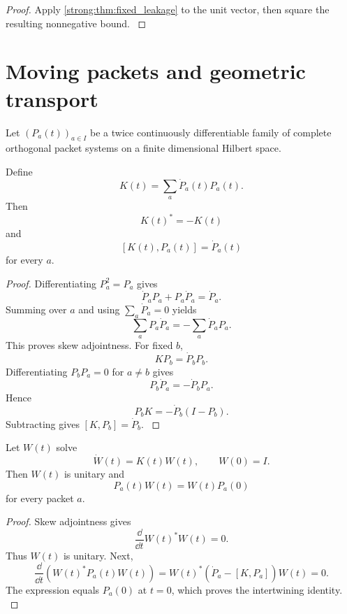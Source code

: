 \begin{proof}\label{strong:proof:020}
Apply \cref{strong:thm:fixed_leakage} to the unit vector, then square the resulting nonnegative bound.
\label{strong:proof:020:end}\end{proof}

\section{Moving packets and geometric transport}\label{strong:section:006}\label{strong:sec:moving_packets}

Let \((P_a(t))_{a\in I}\) be a twice continuously differentiable family of complete orthogonal packet systems on a finite dimensional Hilbert space.

\begin{theorem}\label{strong:theorem:012}\label{strong:thm:kato_connection}
Define
\[
K(t)
=
\sum_a\dot P_a(t)P_a(t).
\]
Then
\[
K(t)^*=-K(t)
\]
and
\[
[K(t),P_a(t)]=\dot P_a(t)
\]
for every \(a\).
\end{theorem}

\begin{proof}\label{strong:proof:021}
Differentiating \(P_a^2=P_a\) gives
\[
\dot P_aP_a+P_a\dot P_a=\dot P_a.
\]
Summing over \(a\) and using \(\sum_a\dot P_a=0\) yields
\[
\sum_aP_a\dot P_a=-\sum_a\dot P_aP_a.
\]
This proves skew adjointness. For fixed \(b\),
\[
KP_b=\dot P_bP_b.
\]
Differentiating \(P_bP_a=0\) for \(a\neq b\) gives
\[
P_b\dot P_a=-\dot P_bP_a.
\]
Hence
\[
P_bK=-\dot P_b(I-P_b).
\]
Subtracting gives \([K,P_b]=\dot P_b\).
\label{strong:proof:021:end}\end{proof}

\begin{theorem}\label{strong:theorem:013}\label{strong:thm:kato_transport}
Let \(W(t)\) solve
\[
\dot W(t)=K(t)W(t),
\qquad
W(0)=I.
\]
Then \(W(t)\) is unitary and
\[
P_a(t)W(t)=W(t)P_a(0)
\]
for every packet \(a\).
\end{theorem}

\begin{proof}\label{strong:proof:022}
Skew adjointness gives
\[
\frac{\dd}{\dd t}W(t)^*W(t)=0.
\]
Thus \(W(t)\) is unitary. Next,
\[
\frac{\dd}{\dd t}
\left(W(t)^*P_a(t)W(t)\right)
=
W(t)^*
\left(
\dot P_a-[K,P_a]
\right)
W(t)=0.
\]
The expression equals \(P_a(0)\) at \(t=0\), which proves the intertwining identity.
\label{strong:proof:022:end}\end{proof}

